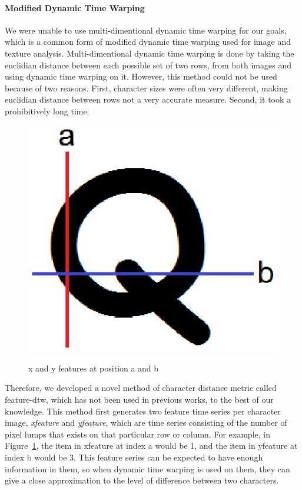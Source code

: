 \documentclass[12pt]{article}
\begin{document}
	\paragraph{Modified Dynamic Time Warping} We were unable to use multi-dimentional dynamic time warping for our goals, which is a common form of modified dynamic time warping used for image and texture analysis. Multi-dimentional dynamic time warping is done by taking the euclidian distance between each possible set of two rows, from both images and using dynamic time warping on it. However, this method could not be used because of two reasons. First, character sizes were often very different, making euclidian distance between rows not a very accurate measure. Second, it took a prohibitively long time.

	\begin{figure}[htbp!]
		\centering
		\includegraphics[scale=0.7]{xyfeatures.eps}
		\label{figure:xyfeatures}
		\caption{x and y features at position a and b}
		\end{figure}
		
	Therefore, we developed a novel method of character distance metric called feature-dtw, which has not been used in previous works, to the best of our knowledge. This method first generates two feature time series per character image, \textit{xfeature} and \textit{yfeature}, which are time series consisting of the number of pixel lumps that exists on that particular row or column. For example, in Figure~\ref{figure:xyfeatures}, the item in xfeature at index a would be 1, and the item in yfeature at index b would be 3. This feature series can be expected to have enough information in them, so when dynamic time warping is used on them, they can give a close approximation to the level of difference between two characters.
	
\end{document}
